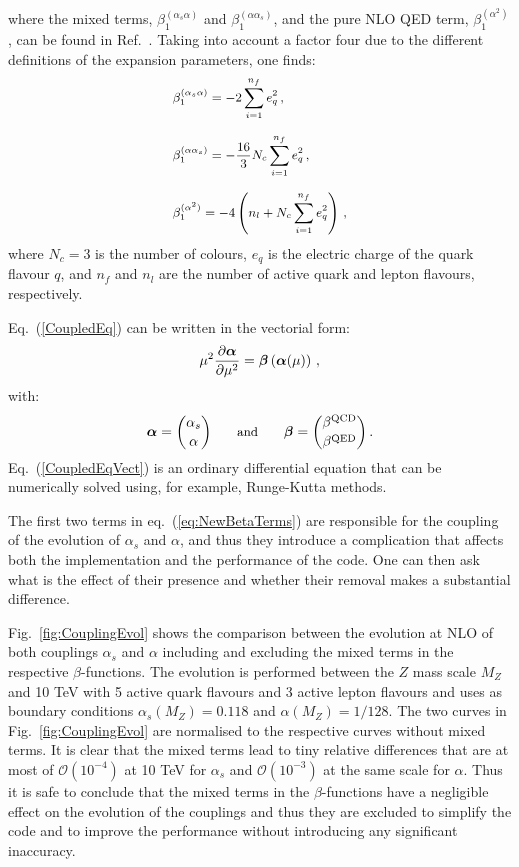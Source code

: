 where the mixed terms, $\beta_1^{(\alpha_s\alpha)}$ and
$\beta_1^{(\alpha\alpha_s)}$, and the pure NLO QED term,
$\beta_1^{(\alpha^2)}$, can be found in
Ref.~\cite{Surguladze:1996hx}. Taking into account a factor four due
to the different definitions of the expansion parameters, one finds:
\begin{equation}\label{eq:NewBetaTerms}
\small
\begin{array}{l}
\displaystyle \beta_1^{(\alpha_s\alpha)} = -2\sum_{i=1}^{n_f}e_q^2\,,\\
\\
\displaystyle \beta_1^{(\alpha\alpha_s)} =
  -\frac{16}{3}N_c\sum_{i=1}^{n_f} e_q^2\,,\\
\\
\displaystyle \beta_1^{(\alpha^2)} = -4\left(n_l+N_c\sum_{i=1}^{n_f} e_q^2\right)\,,
\end{array}
\end{equation}
where $N_c=3$ is the number of colours, $e_q$ is the electric charge
of the quark flavour $q$, and $n_f$ and $n_l$ are the number of active
quark and lepton flavours, respectively.

Eq.~(\ref{CoupledEq}) can be written in the vectorial form:
\begin{equation}\label{CoupledEqVect}
\small
\mu^2\frac{\partial {\bm \alpha}}{\partial \mu^2} = {\bm \beta}\left({\bm \alpha}(\mu)\right)\,,
\end{equation}
with:
\begin{equation}
\small
  {\bm \alpha} = {\alpha_s \choose \alpha}\qquad\mbox{and}\qquad  {\bm \beta} = {\beta^{\rm QCD} \choose \beta^{\rm QED}}\,.
\end{equation}
Eq.~(\ref{CoupledEqVect}) is an ordinary differential equation that
can be numerically solved using, for example, Runge-Kutta methods.

The first two terms in eq.~(\ref{eq:NewBetaTerms}) are responsible for
the coupling of the evolution of $\alpha_s$ and $\alpha$, and thus
they introduce a complication that affects both the implementation and
the performance of the code. One can then ask what is the effect of
their presence and whether their removal makes a substantial
difference.

Fig.~\ref{fig:CouplingEvol} shows the comparison between the evolution
at NLO of both couplings $\alpha_s$ and $\alpha$ including and
excluding the mixed terms in the respective $\beta$-functions. The
evolution is performed between the $Z$ mass scale $M_Z$ and 10 TeV
with 5 active quark flavours and 3 active lepton flavours and uses as
boundary conditions $\alpha_s(M_Z) = 0.118$ and $\alpha(M_Z) = 1/128$.
The two curves in Fig.~\ref{fig:CouplingEvol} are normalised to the
respective curves without mixed terms. It is clear that the mixed
terms lead to tiny relative differences that are at most of
$\mathcal{O}(10^{-4})$ at 10 TeV for $\alpha_s$ and
$\mathcal{O}(10^{-3})$ at the same scale for $\alpha$. Thus it is safe
to conclude that the mixed terms in the $\beta$-functions have a
negligible effect on the evolution of the couplings and thus they are
excluded to simplify the code and to improve the performance without
introducing any significant inaccuracy.

